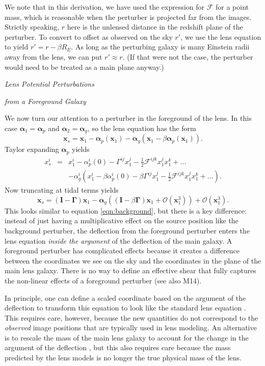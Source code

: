 \documentclass{emulateapj}
\newcommand\I[0]{\mathbf{I}}
\newcommand\GammaMat[0]{\boldsymbol{\Gamma}}
\newcommand\x[0]{\mathbf{x}}
\newcommand\al[0]{\boldsymbol{\alpha}}
\newcommand\sF{{\mathcal F}}
\begin{document}
We note that in this derivation, we have used the expression for $\sF$ for a point mass, which is reasonable when the perturber is projected far from the images.  Strictly speaking, $r$ here is the unlensed distance in the redshift plane of the perturber. To convert to offset as observed on the sky $r'$, we use the lens equation to yield $r' = r - \beta R_E$. As long as the perturbing galaxy is many Einstein radii away from the lens, we can put $r' \approx r$.  (If that were not the case, the perturber would need to be treated as a main plane anyway.)

\medskip
\centerline{\emph{Lens Potential Perturbations}}
\centerline{\emph{from a Foreground Galaxy}}
\medskip

We now turn our attention to a perturber in the foreground of the lens. In this case $\al_1 = \al_p$ and $\al_2 = \al_g$, so the lens equation has the form
\begin{equation}
\x_s =\x_1 - \al_p(\x_1) - \al_g(\x_1 - \beta \al_p(\x_1)).
\end{equation}
Taylor expanding $\al_p$ yields
\begin{eqnarray}
x^i_s &=& x^i_1  - \alpha_p^i(0) - \Gamma^{ij}x^j_1 - \frac{1}{2} \sF^{ijk} x^j_1 x^k_1 +\ldots \\
&& - \alpha^i_g \left(x^i_1 - \beta\alpha_p^i(0) - \beta \Gamma^{ij} x^j_1 - \frac{1}{2} \sF^{ijk} x^j_1 x^k_1 + \ldots \right). \nonumber
\end{eqnarray}
Now truncating at tidal terms yields
\begin{equation}
\x_s = (\I - \GammaMat) \x_1 - \al_g\left((\I - \beta\GammaMat) \x_1 + \mathcal{O}(\x_1^3)\right) + \mathcal{O}(\x_1^3).
\end{equation}
This looks similar to equation \ref{eqn:background}, but there is a key difference: instead of just having a multiplicative effect on the source position like the background perturber, the deflection from the foreground perturber enters the lens equation \emph{inside the argument} of the deflection of the main galaxy. A foreground perturber has complicated effects because it creates a difference between the coordinates we see on the sky and the coordinates in the plane of the main lens galaxy. There is no way to define an effective shear that fully captures the non-linear effects of a foreground perturber (see also M14).

In principle, one can define a scaled coordinate based on the argument of the deflection to transform this equation to look like the standard lens equation \citep[e.g.,][]{Schneider97,Keeton03}. This requires care, however, because the new quantities do not correspond to the \emph{observed} image positions that are typically used in lens modeling. An alternative is to rescale the mass of the main lens galaxy to account for the change in the argument of the deflection \citep{Schneider97}, but this also requires care because the mass predicted by the lens models is no longer the true physical mass of the lens. 
\end{document}
